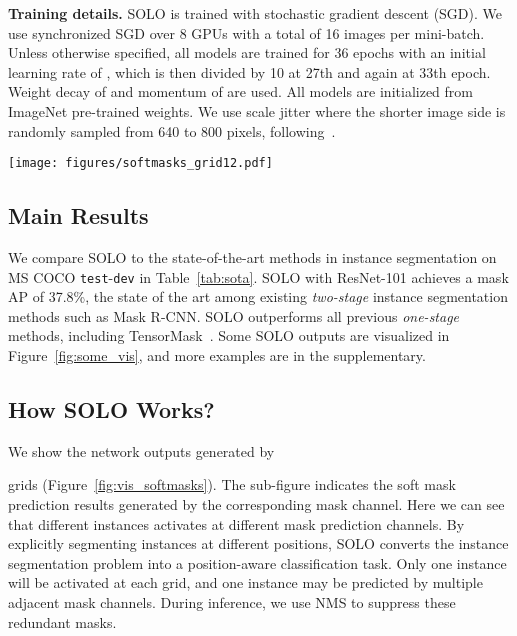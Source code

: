 \documentclass[runningheads]{llncs}
\def\method{{SOLO}\xspace}
\def\OurMethod{{SOLO}\xspace}
\newcommand{\myparagraph}[1]{{ \noindent \bf #1}}
\begin{document}
\myparagraph{Training details.}
\method is trained with stochastic gradient descent (SGD). We use synchronized SGD over 8 GPUs with a total of 16 images per mini-batch.
Unless otherwise specified, all models are trained for  36 epochs with an initial learning rate of , which is then
divided by 10 at 27th and again at 33th epoch. Weight decay of  and momentum of  are used. All models are initialized from ImageNet
pre-trained weights. We use scale jitter where the shorter
image side is randomly sampled from 640 to 800 pixels, following~\cite{Chen_2019_ICCV}.




\begin{figure*}[h]
\begin{center}
    \texttt{[image: figures/softmasks\_grid12.pdf]}
\end{center}
   \caption{\textbf{\OurMethod behavior.} We show the visualization of soft mask prediction.
Here .
   For each column, the top one is the instance segmentation result, and the bottom one shows the mask activation maps.
   The sub-figure  in an activation map indicates the mask prediction results  (after zooming out) generated by the corresponding mask channel. }
\label{fig:vis_softmasks}
\end{figure*}

\subsection{Main Results}

We compare \OurMethod to the state-of-the-art methods in instance segmentation on MS COCO \texttt{test}-\texttt{dev} in Table~\ref{tab:sota}. \OurMethod with ResNet-101 achieves a mask AP of 37.8\%, the state of the art among existing \emph{two-stage} instance segmentation methods such as Mask R-CNN. \OurMethod outperforms all previous \emph{one-stage} methods, including TensorMask~\cite{Chen_2019_ICCV}.
Some \OurMethod outputs are visualized in Figure~\ref{fig:some_vis}, and more examples are in the supplementary.





\subsection{How \OurMethod Works?}
We show the network outputs generated by

grids (Figure~\ref{fig:vis_softmasks}). The sub-figure  indicates the soft mask prediction results generated by the corresponding mask channel. Here we can see that different instances activates at different mask prediction channels. By explicitly segmenting instances at different positions, \OurMethod converts the instance segmentation problem into a position-aware classification task. Only one instance will be activated at each grid, and one instance may be predicted by multiple adjacent mask channels. During inference, we use NMS to suppress these redundant masks.
\end{document}
